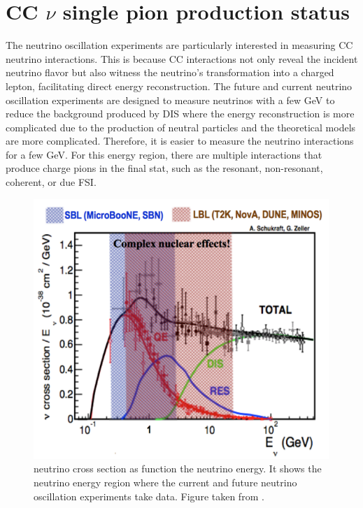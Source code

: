 \section{CC $\nu$ single pion production status}
\label{Cap:Int:Motivation}

The neutrino oscillation experiments are particularly interested in measuring CC neutrino interactions. This is because CC interactions not only reveal the incident neutrino flavor but also witness the neutrino's transformation into a charged lepton, facilitating direct energy reconstruction. The future and current neutrino oscillation experiments are designed to measure neutrinos with a few GeV to reduce the background produced by DIS where the energy reconstruction is more complicated due to the production of neutral particles and the theoretical models are more complicated. Therefore, it is easier to measure the neutrino interactions for a few GeV. For this energy region, there are multiple interactions that produce charge pions in the final stat, such as the resonant, non-resonant, coherent, or due FSI.

 
\begin{figure}[!htb]
    \centering
    \includegraphics[scale=0.3]{Figures/Chapter1/nuXSec.png}
    \caption{neutrino cross section as function the neutrino energy. It shows the neutrino energy region where the current and future neutrino oscillation experiments take data. Figure taken from \cite{gollapinni2016neutrino}.}
    \label{fig:Int:Motivation:nuXsecl}
\end{figure}

